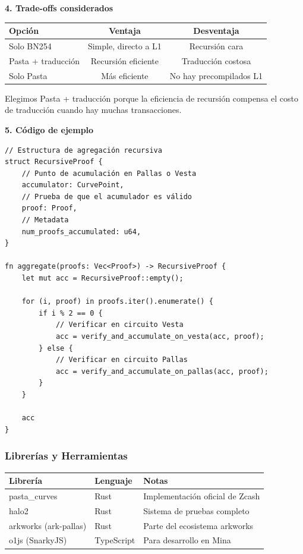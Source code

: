 \documentclass[11pt,a4paper,twoside,openright]{book}
\theoremstyle{definition}
\theoremstyle{plain}
\theoremstyle{remark}
\begin{document}
\begin{bancozk}
\textbf{4. Trade-offs considerados}

\begin{center}
\begin{tabular}{lcc}
\toprule
\textbf{Opción} & \textbf{Ventaja} & \textbf{Desventaja} \\
\midrule
Solo BN254 & Simple, directo a L1 & Recursión cara \\
Pasta + traducción & Recursión eficiente & Traducción costosa \\
Solo Pasta & Más eficiente & No hay precompilados L1 \\
\bottomrule
\end{tabular}
\end{center}

Elegimos Pasta + traducción porque la eficiencia de recursión compensa el costo de traducción cuando hay muchas transacciones.

\textbf{5. Código de ejemplo}

\begin{verbatim}
// Estructura de agregación recursiva
struct RecursiveProof {
    // Punto de acumulación en Pallas o Vesta
    accumulator: CurvePoint,
    // Prueba de que el acumulador es válido
    proof: Proof,
    // Metadata
    num_proofs_accumulated: u64,
}

fn aggregate(proofs: Vec<Proof>) -> RecursiveProof {
    let mut acc = RecursiveProof::empty();
    
    for (i, proof) in proofs.iter().enumerate() {
        if i % 2 == 0 {
            // Verificar en circuito Vesta
            acc = verify_and_accumulate_on_vesta(acc, proof);
        } else {
            // Verificar en circuito Pallas
            acc = verify_and_accumulate_on_pallas(acc, proof);
        }
    }
    
    acc
}
\end{verbatim}
\end{bancozk}

\subsubsection{Librerías y Herramientas}

\begin{center}
\begin{tabular}{lll}
\toprule
\textbf{Librería} & \textbf{Lenguaje} & \textbf{Notas} \\
\midrule
pasta\_curves & Rust & Implementación oficial de Zcash \\
halo2 & Rust & Sistema de pruebas completo \\
arkworks (ark-pallas) & Rust & Parte del ecosistema arkworks \\
o1js (SnarkyJS) & TypeScript & Para desarrollo en Mina \\
\bottomrule
\end{tabular}
\end{center}
\end{document}
